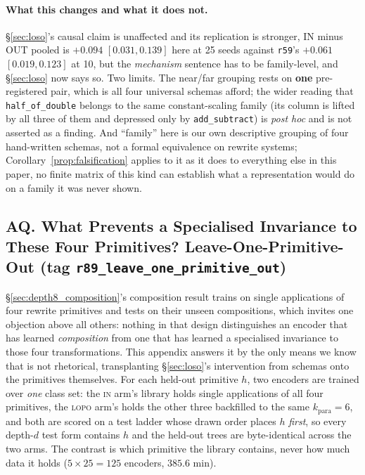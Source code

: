 \paragraph{What this changes and what it does not.} \S\ref{sec:loso}'s causal claim is unaffected and its replication is stronger, IN minus OUT pooled is $+0.094$ $[0.031,0.139]$ here at 25 seeds against \texttt{r59}'s $+0.061$ $[0.019,0.123]$ at 10, but the \emph{mechanism} sentence has to be family-level, and \S\ref{sec:loso} now says so. Two limits. The near/far grouping rests on \textbf{one} pre-registered pair, which is all four universal schemas afford; the wider reading that \texttt{half\_of\_double} belongs to the same constant-scaling family (its column is lifted by all three of them and depressed only by \texttt{add\_subtract}) is \emph{post hoc} and is not asserted as a finding. And ``family'' here is our own descriptive grouping of four hand-written schemas, not a formal equivalence on rewrite systems; Corollary~\ref{prop:falsification} applies to it as it does to everything else in this paper, no finite matrix of this kind can establish what a representation would do on a family it was never shown.

\subsection*{AQ. What Prevents a Specialised Invariance to These Four Primitives? Leave-One-Primitive-Out (tag \texttt{r89\_leave\_one\_primitive\_out})}

\S\ref{sec:depth8_composition}'s composition result trains on single applications of four rewrite primitives and tests on their unseen compositions, which invites one objection above all others: nothing in that design distinguishes an encoder that has learned \emph{composition} from one that has learned a specialised invariance to those four transformations. This appendix answers it by the only means we know that is not rhetorical, transplanting \S\ref{sec:loso}'s intervention from schemas onto the primitives themselves. For each held-out primitive $h$, two encoders are trained over \emph{one} class set: the \textsc{in} arm's library holds single applications of all four primitives, the \textsc{lopo} arm's holds the other three backfilled to the same $k_{\mathrm{para}}{=}6$, and both are scored on a test ladder whose drawn order places $h$ \emph{first}, so every depth-$d$ test form contains $h$ and the held-out trees are byte-identical across the two arms. The contrast is which primitive the library contains, never how much data it holds ($5\times25 = 125$ encoders, $385.6$ min).

